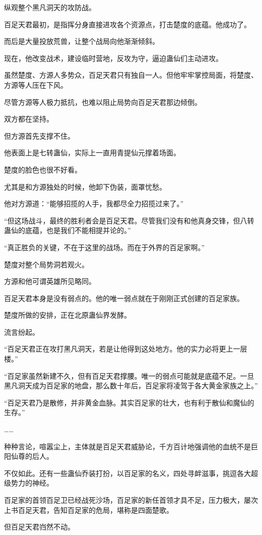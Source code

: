 \begin{this_body}
纵观整个黑凡洞天的攻防战。

百足天君最初，是指挥分身直接进攻各个资源点，打击楚度的底蕴。他成功了。

而后是大量投放荒兽，让整个战局向他渐渐倾斜。

现在，他改变战术，建设临时营地，反攻为守，逼迫蛊仙们主动进攻。

虽然楚度、方源人多势众，百足天君只有独自一人。但他牢牢掌控局面，将楚度、方源等人压在下风。

尽管方源等人极力抵抗，也难以阻止局势向百足天君那边倾倒。

双方都在坚持。

但方源首先支撑不住。

他表面上是七转蛊仙，实际上一直用青提仙元撑着场面。

楚度的脸色也很不好看。

尤其是和方源独处的时候，他卸下伪装，面罩忧愁。

他对方源道：“能够招揽的人手，我都尽全力招揽过来了。”

“但这场战斗，最终的胜利者会是百足天君。尽管我们没有和他真身交锋，但八转蛊仙的底蕴，也是我们不能相提并论的。”

“真正胜负的关键，不在于这里的战场。而在于外界的百足家啊。”

楚度对整个局势洞若观火。

方源和他可谓英雄所见略同。

百足天君本身是没有弱点的。他的唯一弱点就在于刚刚正式创建的百足家族。

楚度所做的安排，正在北原蛊仙界发酵。

流言纷起。

“百足天君正在攻打黑凡洞天，若是让他得到这处地方。他的实力必将更上一层楼。”

“百足家虽然新建不久，但有百足天君撑腰。唯一的弱点可能就是底蕴不足。一旦黑凡洞天成为百足家的地盘，那么数十年后，百足家将凌驾于各大黄金家族之上。”

“百足天君乃是散修，并非黄金血脉。其实百足家的壮大，也有利于散仙和魔仙的生存。”

……

种种言论，喧嚣尘上，主体就是百足天君威胁论，千方百计地强调他的血统不是巨阳仙尊的后人。

不仅如此。还有一些蛊仙乔装打扮，以百足家的名义，四处寻衅滋事，挑逗各大超级势力的神经。

百足家的首领百足卫已经战死沙场，百足家的新任首领才具不足，压力极大，屡次上书百足天君，告知百足家的危局，堪称是四面楚歌。

但百足天君岿然不动。


\end{this_body}
